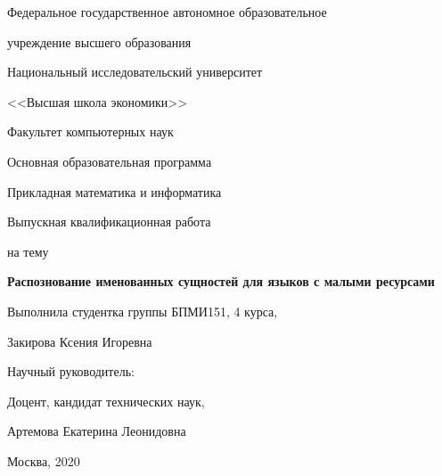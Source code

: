 
\large
\bigskip

\begin{center}
{\large Федеральное государственное автономное образовательное 

учреждение высшего образования

Национальный исследовательский университет

\smallskip

<<Высшая школа экономики>>

}

\bigskip
\bigskip
\bigskip

{ \large
Факультет компьютерных наук

Основная образовательная программа

Прикладная математика и информатика
}
\end{center}

\begin{center}
  {\large Выпускная квалификационная работа}
  
  {\large на тему}
\end{center}

\begin{center}
  \textbf{\huge Распознование именованных сущностей для языков с малыми ресурсами}
\end{center}


\renewcommand{\arraystretch}{1.8} %

\bigskip
\bigskip
\bigskip
\bigskip

{\large Выполнила студентка группы БПМИ151, 4 курса,

\hspace{3cm} Закирова Ксения Игоревна


Научный руководитель:

\hspace{3cm} Доцент, кандидат технических наук,

\hspace{3cm} Артемова Екатерина Леонидовна


}
    
\bigskip
\bigskip

\bigskip
\bigskip
\bigskip
\pagestyle{empty}

\vfill
\begin{center}
  {Москва, 2020}
\end{center}

\newpage